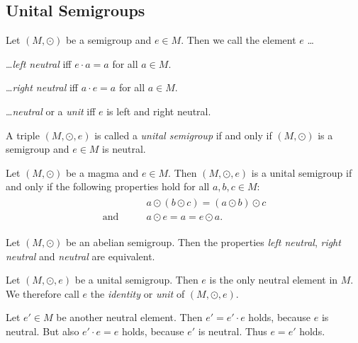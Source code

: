 \subsection{Unital Semigroups}

\begin{definition}
    Let $(M,\odot)$ be a semigroup and $e\in M$. Then we call the element $e$ \dots
    \begin{definitionenumerate}
        \item \dots \emph{left neutral} iff $e\cdot a=a$ for all $a\in M$.
        \item \dots \emph{right neutral} iff $a\cdot e=a$ for all $a\in M$.
        \item \dots \emph{neutral} or a \emph{unit} iff $e$ is left and right neutral.
    \end{definitionenumerate}
    A triple $(M,\odot,e)$ is called a \emph{unital semigroup} if and only if $(M,\odot)$ is a semigroup and $e\in M$ is neutral.
\end{definition}

\begin{remarks}
    \begin{remarkenumerate}
        \item Let $(M,\odot)$ be a magma and $e\in M$. Then $(M,\odot,e)$ is a unital semigroup if and only if the following properties hold for all $a,b,c\in M$:
        \begin{align}\begin{split}
            &a\odot (b\odot c)=(a\odot b)\odot c\\
            \text{and}\qquad& a\odot e=a=e\odot a.
        \end{split}\end{align}
        \item Let $(M,\odot)$ be an abelian semigroup. Then the properties \emph{left neutral}, \emph{right neutral} and \emph{neutral} are equivalent.
        \item Let $(M,\odot,e)$ be a unital semigroup. Then $e$ is the only neutral element in $M$. We therefore call $e$ the \emph{identity} or \emph{unit} of $(M,\odot,e)$.
        \begin{miniproof}
            Let $e'\in M$ be another neutral element. Then $e'=e'\cdot e$ holds, because $e$ is neutral. But also $e'\cdot e=e$ holds, because $e'$ is neutral. Thus $e=e'$ holds.
        \end{miniproof}
    \end{remarkenumerate}
\end{remarks}

